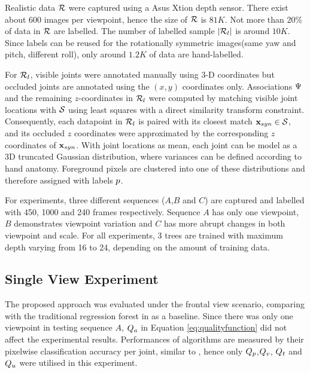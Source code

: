 Realistic data $\mathcal{R}$ were captured using a Asus Xtion depth sensor. There exist about $600$ images per viewpoint, hence the size of $\mathcal{R}$ is $81K$. Not more than $20\%$ of data in $\mathcal{R}$ are labelled. The number of labelled sample $|\mathcal{R}_{l}|$ is around $10K$. Since labels can be reused for the rotationally symmetric images(same yaw and pitch, different roll), only around $1.2K$ of data are hand-labelled.    

For $\mathcal{R}_{l}$, visible joints were annotated manually using 3-D coordinates but occluded joints are annotated using the $(x,y)$ coordinates only. 
Associations $\mathrm{\Psi}$ and the remaining $z$-coordinates in $\mathcal{R}_{l}$ were computed by matching visible joint locations with $\mathcal{S}$ using least squares with a direct similarity transform constraint. Consequently, each datapoint in $\mathcal{R}_{l}$ is paired with its closest match $\mathbf{x}_{syn} \in \mathcal{S}$, and its occluded $z$ coordinates were approximated by the corresponding $z$ coordinates of $\mathbf{x}_{syn}$.
With joint locations as mean, each joint can be model as a 3D truncated Gaussian distribution, where variances can be defined according to hand anatomy. Foreground pixels are clustered into one of these distributions and therefore assigned with labels $p$.

For experiments, three different sequences ($A$,$B$ and $C$) are captured and labelled with 450, 1000 and 240 frames respectively. Sequence $A$ has only one viewpoint, $B$ demonstrates viewpoint variation and $C$ has more abrupt changes in both viewpoint and scale. For all experiments, 3 trees are trained with maximum depth varying from 16 to 24, depending on the amount of training data.




\subsection{Single View Experiment} 

The proposed approach was evaluated under the frontal view scenario, comparing with the traditional regression forest in \cite{Gall_PAMI_11} as a baseline. Since there was only one viewpoint in testing sequence $A$,  $Q_{a}$ in Equation \ref{eq:qualityfunction} did not affect the experimental results.  
Performances of algorithms are measured by their pixelwise classification accuracy per joint, similar to \cite{Shotton_CVPR_11}, hence only $Q_{p}$,$Q_{v}$, $Q_{t}$ and $Q_{u}$ were utilised in this experiment.    

